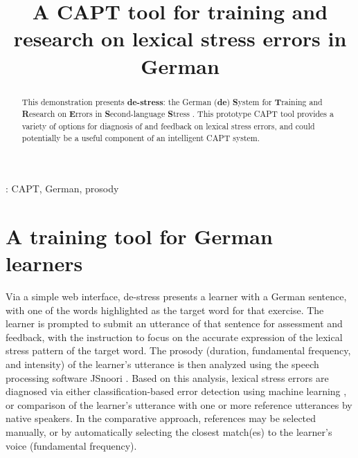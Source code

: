 \documentclass[a4paper]{article}
\title{A CAPT tool for training and research on lexical stress errors in German}
\begin{document}
  \maketitle
  \begin{abstract}
    This demonstration presents \textbf{de-stress}: the German (\textbf{de}) \textbf{S}ystem for \textbf{T}raining and \textbf{R}esearch on \textbf{E}rrors in \textbf{S}econd-language \textbf{S}tress \cite{destress}. 
    This prototype CAPT tool provides a variety of options for diagnosis of and feedback on lexical stress errors, and could potentially be a useful component of an intelligent CAPT system.
  \end{abstract}
  : CAPT, German, prosody


	
%

\section{A training tool for German learners}

 Via a simple web interface, de-stress presents a learner with a German sentence,
 with one of the words highlighted as the target word for that exercise. The learner is prompted to submit an utterance of that sentence for assessment and feedback, with the instruction to focus on the accurate expression of the lexical stress pattern of the target word. The prosody (duration, fundamental frequency, and intensity) of the learner's utterance is then analyzed using the speech processing software JSnoori \cite{jsnoori}. Based on this analysis, lexical stress errors are diagnosed via either classification-based error detection using machine learning \cite{Vakil2015}, or comparison of the learner's utterance with one or more reference utterances by native speakers. In the comparative approach, references may be selected manually, or by automatically selecting the closest match(es) to the learner's voice (fundamental frequency). 
 
\end{document}
